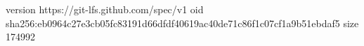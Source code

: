 version https://git-lfs.github.com/spec/v1
oid sha256:eb0964c27e3cb05fc83191d66dfdf40619ac40de71c86f1c07cf1a9b51ebdaf5
size 174992
